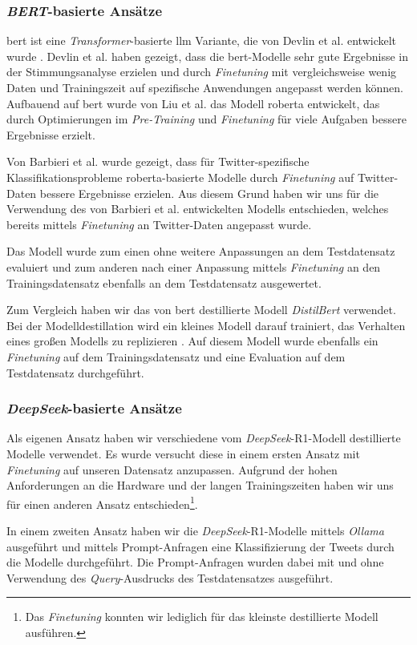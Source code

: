 \subsubsection{\textit{BERT}-basierte Ansätze}\label{subsec:bert}

\gls{bert} ist eine \textit{Transformer}-basierte \gls{llm} Variante, die von Devlin et al. entwickelt wurde \cite{devlin2018bert}.
Devlin et al. haben gezeigt, dass die \gls{bert}-Modelle sehr gute Ergebnisse in der Stimmungsanalyse erzielen und durch \textit{Finetuning} mit vergleichsweise wenig Daten und Trainingszeit auf spezifische Anwendungen angepasst werden können.
Aufbauend auf \gls{bert} wurde von Liu et al. \cite{liu2019roberta} das Modell \gls{roberta} entwickelt, das durch Optimierungen im \textit{Pre-Training} und \textit{Finetuning} für viele Aufgaben bessere Ergebnisse erzielt.

Von Barbieri et al. \cite{barbieri2020tweeteval} wurde gezeigt, dass für Twitter-spezifische Klassifikationsprobleme \gls{roberta}-basierte Modelle durch \textit{Finetuning} auf Twitter-Daten bessere Ergebnisse erzielen.
Aus diesem Grund haben wir uns für die Verwendung des von Barbieri et al. entwickelten Modells entschieden, welches bereits mittels \textit{Finetuning} an Twitter-Daten angepasst wurde.

Das Modell wurde zum einen ohne weitere Anpassungen an dem Testdatensatz evaluiert und zum anderen nach einer Anpassung mittels \textit{Finetuning} an den Trainingsdatensatz ebenfalls an dem Testdatensatz ausgewertet.

Zum Vergleich haben wir das von \gls{bert} destillierte Modell \textit{DistilBert} \cite{sanh2019distilbert} verwendet.
Bei der Modelldestillation wird ein kleines Modell darauf trainiert, das Verhalten eines großen Modells zu replizieren \cite{sanh2019distilbert}.
Auf diesem Modell wurde ebenfalls ein \textit{Finetuning} auf dem Trainingsdatensatz und eine Evaluation auf dem Testdatensatz durchgeführt.


\subsubsection{\textit{DeepSeek}-basierte Ansätze}\label{subsec:deepseek}

Als eigenen Ansatz haben wir verschiedene vom \textit{DeepSeek}-R1-Modell destillierte Modelle \cite{deepseekai2025deepseekr1incentivizingreasoningcapability} verwendet.
Es wurde versucht diese in einem ersten Ansatz mit \textit{Finetuning} auf unseren Datensatz anzupassen.
Aufgrund der hohen Anforderungen an die Hardware und der langen Trainingszeiten haben wir uns für einen anderen Ansatz entschieden\footnote{Das \textit{Finetuning} konnten wir lediglich für das kleinste destillierte Modell ausführen.}.

In einem zweiten Ansatz haben wir die \textit{DeepSeek}-R1-Modelle mittels \textit{Ollama} \cite{ollama2025meta} ausgeführt und mittels Prompt-Anfragen eine Klassifizierung der Tweets durch die Modelle durchgeführt.
Die Prompt-Anfragen wurden dabei mit und ohne Verwendung des \textit{Query}-Ausdrucks des Testdatensatzes ausgeführt.
